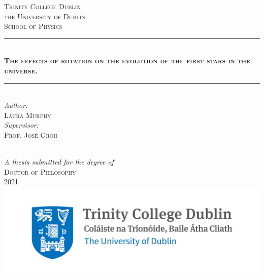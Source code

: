 
\begin{titlepage}
\newcommand{\HRule}{\rule{\linewidth}{0.5mm}} %

\center 


\textsc{\Large Trinity College Dublin \\ the University of Dublin}\\[0.5cm] 
\textsc{\large School of Physics}\\[1.0cm] 

\makeatletter
\HRule \\[0.4cm]
\doublespacing
\textsc{ \huge \bfseries The effects of rotation on the evolution of the first stars in the universe.}\\[0.4cm] %
\HRule \\[1cm]
 

\center 
\large
\emph{Author:}\\
\LARGE
\textsc{Laura Murphy}\\

\center 
\large
\emph{Supervisor:} \\
\textsc{Prof. Jos{\'e} Groh}



\quad\\[0.5cm]

{\large \emph{A thesis submitted for the degree of}}\\[0.5cm]
\textsc{\Large Doctor of Philosophy}\\[0.5cm]
{\large 2021}\\[1cm] 
\center 
\includegraphics[width=0.75\columnwidth]{tcd_logo.png}
\vfill

\end{titlepage}